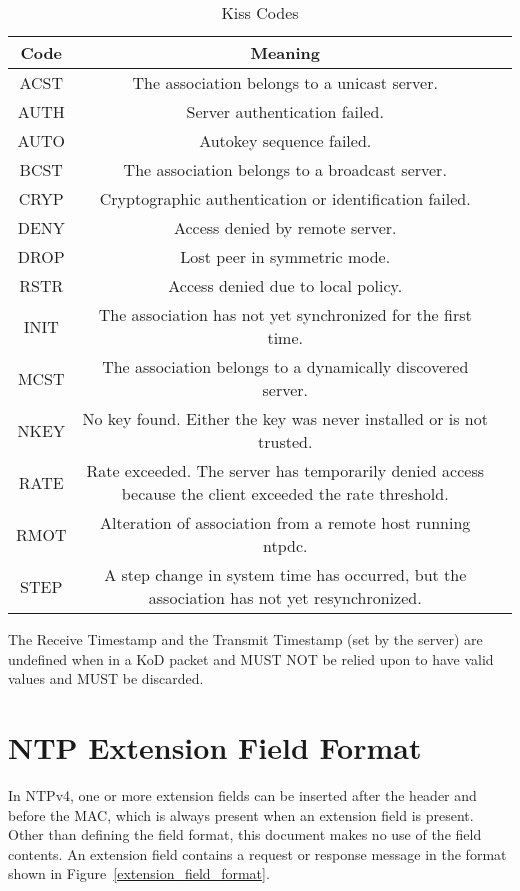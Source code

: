 \begin{table}[htb]
\center
\begin{tabular}{c | c | c}
Code & Meaning \\
\hline
\hline
ACST & The association belongs to a unicast server. \\
AUTH & Server authentication failed. \\
AUTO & Autokey sequence failed. \\
BCST & The association belongs to a broadcast server. \\
CRYP & Cryptographic authentication or identification failed. \\
DENY & Access denied by remote server. \\
DROP & Lost peer in symmetric mode. \\
RSTR & Access denied due to local policy. \\
INIT & The association has not yet synchronized for the first time. \\
MCST & The association belongs to a dynamically discovered server.\\
NKEY & No key found. Either the key was never installed or is not trusted. \\
RATE & Rate exceeded. The server has temporarily denied access because the client exceeded the rate threshold. \\
RMOT & Alteration of association from a remote host running ntpdc. \\
STEP & A step change in system time has occurred, but the association has not yet resynchronized. \\
\hline
\end{tabular}
\label{kiss_codes}
\caption{Kiss Codes}
\end{table}

The Receive Timestamp and the Transmit Timestamp (set by the server)
are undefined when in a KoD packet and MUST NOT be relied upon to
have valid values and MUST be discarded.

\section{NTP Extension Field Format}
\label{section-7-5}

In NTPv4, one or more extension fields can be inserted after the
header and before the MAC, which is always present when an extension
field is present. Other than defining the field format, this
document makes no use of the field contents. An extension field
contains a request or response message in the format shown in
Figure~\ref{extension_field_format}.

